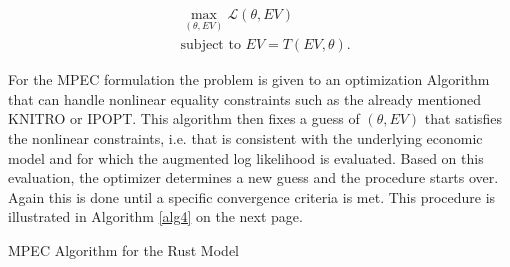 \begin{equation}
\begin{aligned}
& \max_{(\theta, EV)} \mathcal{L}(\theta, EV) \\
& \text{subject to } EV = T(EV, \theta).
\end{aligned}
\label{eq2}
\end{equation}

For the MPEC formulation the problem is given to an optimization Algorithm that can handle nonlinear equality constraints such as the already mentioned KNITRO or IPOPT. This algorithm then fixes a guess of $(\theta, EV)$ that satisfies the nonlinear constraints, i.e. that is consistent with the underlying economic model and for which the augmented log likelihood is evaluated. Based on this evaluation, the optimizer determines a new guess and the procedure starts over. Again this is done until a specific convergence criteria is met. This procedure is illustrated in Algorithm \ref{alg4} on the next page.


\vspace{2ex}
\begin{algorithm}[!h]
	\caption{MPEC Algorithm for the Rust Model}
	\label{alg4}
	\SetAlgoLined
\end{algorithm}
\vspace{2ex}

